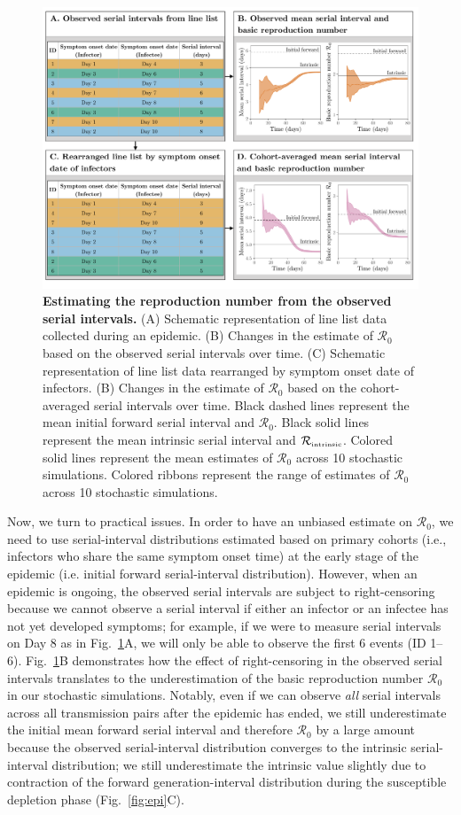 \documentclass[12pt]{article}
\newcommand{\fref}[1]{Fig.~\ref{fig:#1}}
\newcommand{\Rx}[1]{\ensuremath{{\mathcal R}_{#1}}\xspace}
\newcommand{\Ro}{\Rx{0}}
\newcommand{\Rintrinsic}{\ensuremath{{\mathcal R}_{\textrm{\tiny intrinsic}}}\xspace}
\begin{document}
\begin{figure}[!ht]
\includegraphics[width=\textwidth]{diagram.pdf}
\caption{
\textbf{Estimating the reproduction number from the observed serial intervals.}
(A) Schematic representation of line list data collected during an epidemic.
(B) Changes in the estimate of \Ro based on the observed serial intervals over time.
(C) Schematic representation of line list data rearranged by symptom onset date of infectors.
(B) Changes in the estimate of \Ro based on the cohort-averaged serial intervals over time.
Black dashed lines represent the mean initial forward serial interval and \Ro.
Black solid lines represent the mean intrinsic serial interval and \Rintrinsic.
Colored solid lines represent the mean estimates of \Ro across 10 stochastic simulations.
Colored ribbons represent the range of estimates of \Ro across 10 stochastic simulations.
}
\label{fig:obsrR}
\end{figure}

Now, we turn to practical issues.
In order to have an unbiased estimate on \Ro, we need to use serial-interval distributions estimated based on primary cohorts (i.e., infectors who share the same symptom onset time) at the early stage of the epidemic (i.e. initial forward serial-interval distribution).
However, when an epidemic is ongoing, the observed serial intervals are subject to right-censoring because we cannot observe a serial interval if either an infector or an infectee has not yet developed symptoms;
for example, if we were to measure serial intervals on Day 8 as in \fref{obsrR}A, we will only be able to observe the first 6 events (ID 1--6).
\fref{obsrR}B demonstrates how the effect of right-censoring in the observed serial intervals translates to the underestimation of the basic reproduction number \Ro in our stochastic simulations.
Notably, even if we can observe \emph{all} serial intervals across all transmission pairs after the epidemic has ended, we still underestimate the initial mean forward serial interval and therefore \Ro by a large amount because the observed serial-interval distribution converges to the intrinsic serial-interval distribution;
we still underestimate the intrinsic value slightly due to contraction of the forward generation-interval distribution during the susceptible depletion phase (\fref{epi}C).
\end{document}
